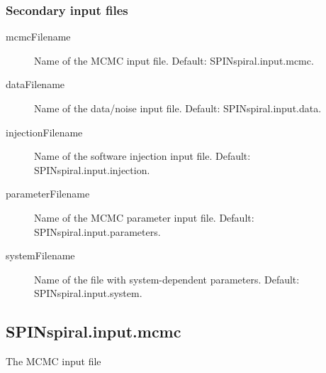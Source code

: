 \subsubsection{Secondary input files}
\begin{description}
\item[mcmcFilename] Name of the MCMC input file.  Default: SPINspiral.input.mcmc.
\item[dataFilename] Name of the data/noise input file.  Default: SPINspiral.input.data.
\item[injectionFilename] Name of the software injection input file.  Default: SPINspiral.input.injection.
\item[parameterFilename] Name of the MCMC parameter input file.  Default: SPINspiral.input.parameters.
\item[systemFilename] Name of the file with system-dependent parameters.  Default: SPINspiral.input.system.
\end{description}










\pagebreak
\subsection{SPINspiral.input.mcmc}                                                                                                                                               
The MCMC input file                                                                                                                                                 
                                                                                                                                                                    

